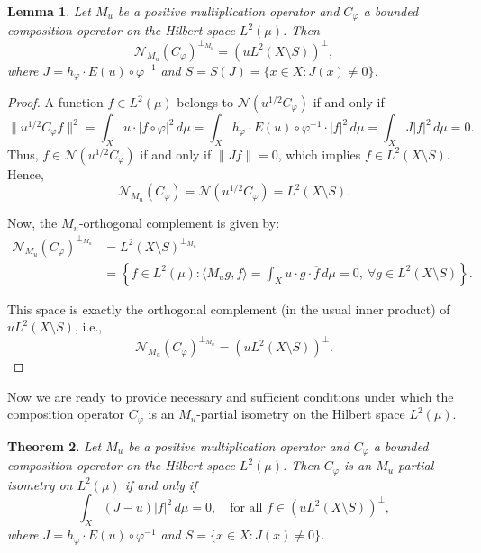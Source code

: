 \documentclass{amsart}
\newtheorem{thm}{Theorem}[section]
\newtheorem{lem}[thm]{Lemma}
\theoremstyle{definition}\newtheorem{defn}[thm]{Definition}
\theoremstyle{remark}
\numberwithin{equation}{section}
\begin{document}
\begin{lem}\label{l1}
Let \( M_u \) be a positive multiplication operator and \( C_{\varphi} \) a bounded composition operator on the Hilbert space \( L^2(\mu) \). Then
\[
\mathcal{N}_{M_u}(C_{\varphi})^{\perp_{M_u}} = \left(u L^2(X \setminus S)\right)^{\perp},
\]
where \( J = h_{\varphi} \cdot E(u) \circ \varphi^{-1} \) and \( S = S(J) = \{ x \in X : J(x) \neq 0 \} \).
\end{lem}

\begin{proof}
A function \( f \in L^2(\mu) \) belongs to \( \mathcal{N}(u^{1/2} C_{\varphi}) \) if and only if
\[
\|u^{1/2} C_{\varphi} f\|^2 = \int_X u \cdot |f \circ \varphi|^2 \, d\mu = \int_X h_{\varphi} \cdot E(u) \circ \varphi^{-1} \cdot |f|^2 \, d\mu = \int_X J |f|^2 \, d\mu = 0.
\]
Thus, \( f \in \mathcal{N}(u^{1/2} C_{\varphi}) \) if and only if \( \|J f\| = 0 \), which implies \( f \in L^2(X \setminus S) \). Hence,
\[
\mathcal{N}_{M_u}(C_{\varphi}) = \mathcal{N}(u^{1/2} C_{\varphi}) = L^2(X \setminus S).
\]

Now, the \( M_u \)-orthogonal complement is given by:
\begin{align*}
\mathcal{N}_{M_u}(C_{\varphi})^{\perp_{M_u}} 
&= L^2(X \setminus S)^{\perp_{M_u}} \\
&= \left\{ f \in L^2(\mu) : \langle M_u g, f \rangle = \int_X u \cdot g \cdot \overline{f} \, d\mu = 0, \ \forall g \in L^2(X \setminus S) \right\}.
\end{align*}

This space is exactly the orthogonal complement (in the usual inner product) of \( u L^2(X \setminus S) \), i.e.,
\[
\mathcal{N}_{M_u}(C_{\varphi})^{\perp_{M_u}} = \left(u L^2(X \setminus S)\right)^{\perp}.
\]
\end{proof}
Now we are ready to provide necessary and sufficient conditions under which the composition operator \( C_{\varphi} \) is an \( M_u \)-partial isometry on the Hilbert space \( L^2(\mu) \).

\begin{thm}\label{t1.5}
Let \( M_u \) be a positive multiplication operator and \( C_{\varphi} \) a bounded composition operator on the Hilbert space \( L^2(\mu) \). Then \( C_{\varphi} \) is an \( M_u \)-partial isometry on \( L^2(\mu) \) if and only if
\[
\int_X (J - u) |f|^2 \, d\mu = 0, \quad \text{for all } f \in \left(u L^2(X \setminus S)\right)^{\perp},
\]
where \( J = h_{\varphi} \cdot E(u) \circ \varphi^{-1} \) and \( S = \{ x \in X : J(x) \neq 0 \} \).
\end{thm}
\end{document}
